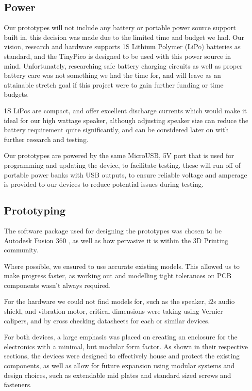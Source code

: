         \subsection{Power}
        \label{subsec: Power}
            Our prototypes will not include any battery or portable power source support built in, this decision was made due to the limited time and budget we had. Our vision, research and hardware supports 1S Lithium Polymer (LiPo) batteries as standard, and the TinyPico is designed to be used with this power source in mind. Unfortunately, researching safe battery charging circuits as well as proper battery care was not something we had the time for, and will leave as an attainable stretch goal if this project were to gain further funding or time budgets.

            1S LiPos are compact, and offer excellent discharge currents which would make it ideal for our high wattage speaker, although adjusting speaker size can reduce the battery requirement quite significantly, and can be considered later on with further research and testing.

            Our prototypes are powered by the same MicroUSB, 5V port that is used for programming and updating the device, to facilitate testing, these will run off of portable power banks with USB outputs, to ensure reliable voltage and amperage is provided to our devices to reduce potential issues during testing.

        \subsection{Prototyping}
        \label{subsec: Prototyping}
        
            The software package used for designing the prototypes was chosen to be Autodesk Fusion 360 \cite{autodesk_2021}, as well as how pervasive it is within the 3D Printing community.

            Where possible, we ensured to use accurate existing models. This allowed us to make progress faster, as working out and modelling tight tolerances on PCB components wasn't always required. 

            For the hardware we could not find models for, such as the speaker, i2s audio shield, and vibration motor, critical dimensions were taking using Vernier calipers, and by cross checking datasheets for each or similar devices.

            For both devices, a large emphasis was placed on creating an enclosure for the electronics with a minimal, but modular form factor. As shown in their respective sections, the devices were designed to effectively house and protect the existing components, as well as allow for future expansion using modular systems and design choices, such as extendable mid plates and standard sized screws and fasteners.


